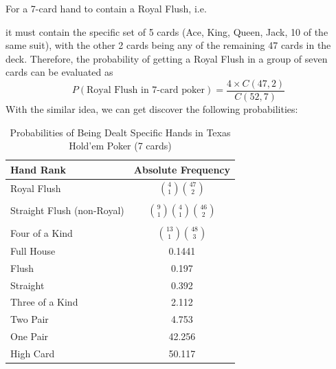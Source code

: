 \documentclass{article}
\begin{document}
For a 7-card hand to contain a Royal Flush, i.e.
\begin{center}
\end{center}
it must contain the specific set of 5 cards 
(Ace, King, Queen, Jack, 10 of the same suit), 
with the other 2 cards being any of the remaining 47 cards in the deck. 
Therefore, the probability of getting a Royal Flush in a group of seven 
cards can be evaluated as 
\[
P(\text{Royal Flush in 7-card poker}) = \frac{4 \times C(47, 2)}{C(52, 7)}
\]
With the similar idea, we can get discover the following probabilities:
\begin{table}[ht]
    \centering
    \caption{Probabilities of Being Dealt Specific Hands in Texas Hold'em Poker (7 cards)}
    \label{tab:poker_hands}
    \begin{tabularx}{\textwidth}{@{}Xc@{}} %
    \toprule
    Hand Rank                  & Absolute Frequency \\ \midrule
    Royal Flush                & $\displaystyle \binom{4}{1} \binom{47}{2}$       \\
    \\
    Straight Flush (non-Royal) & $\displaystyle \binom{9}{1} \binom{4}{1} \binom{46}{2}$          \\
    \\
    Four of a Kind             & $\displaystyle \binom{13}{1} \binom{48}{3}$           \\
    Full House                 & 0.1441           \\
    Flush                      & 0.197            \\
    Straight                   & 0.392            \\
    Three of a Kind            & 2.112            \\
    Two Pair                   & 4.753            \\
    One Pair                   & 42.256           \\
    High Card                  & 50.117           \\ \bottomrule
    \end{tabularx}
\end{table}
\end{document}
